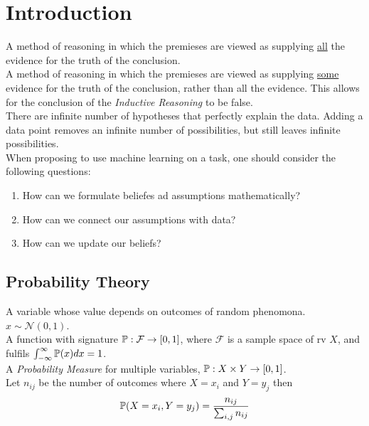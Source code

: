 \documentclass[11pt,a4paper]{article}
\begin{document}
\newpage

\section{Introduction}

A method of reasoning in which the premieses are viewed as supplying \underline{all} the evidence for the truth of the conclusion.\\

A method of reasoning in which the premieses are viewed as supplying \underline{some} evidence for the truth of the conclusion, rather than all the evidence. This allows for the conclusion of the \textit{Inductive Reasoning} to be false.\\

There are infinite number of hypotheses that perfectly explain the data. Adding a data point removes an infinite number of possibilities, but still leaves infinite possibilities.\\

When proposing to use machine learning on a task, one should consider the following questions:
\begin{enumerate}[label=\roman*)]
	\item How can we formulate beliefes ad assumptions mathematically?
	\item How can we connect our assumptions with data?
	\item How can we update our beliefs?
\end{enumerate}

\subsection{Probability Theory}

A variable whose value depends on outcomes of random phenomona.\\
\eg $x\sim\mathcal{N}(0,1)$.\\

A function with signature $\mathbb{P}:\mathcal{F}\to[0,1]$, where $\mathcal{F}$ is a sample space of rv $X$, and fulfils $\int_{-\infty}^{\infty}\mathbb{P}(x)dx=1$.\\

A \textit{Probability Measure} for multiple variables, $\mathbb{P}:X\times Y\to[0,1]$.\\
Let $n_{ij}$ be the number of outcomes where $X=x_i$ and $Y=y_j$ then
$$\mathbb{P}(X=x_i,Y=y_j)=\frac{n_{ij}}{\sum_{i,j}n_{ij}}$$
\end{document}
